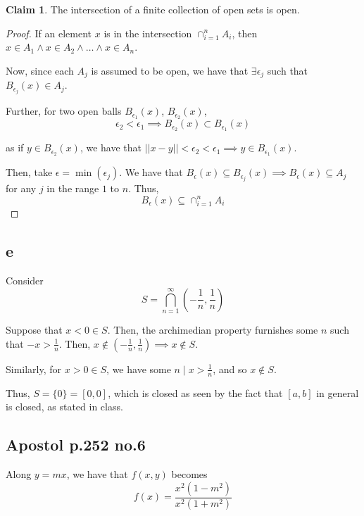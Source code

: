 \documentclass[12pt,letterpaper]{article}
\theoremstyle{definition}
\newtheorem*{claim}{Claim}
\begin{document}
\begin{claim}
  The intersection of a finite collection of open sets is open.
\end{claim}

\begin{proof}
  
  If an element $x$ is in the intersection $\cap_{i=1}^n A_i$, then $x \in A_{1} \land x \in A_{2} \land \dots \land
  x \in A_{n}$.

  Now, since each $A_{j}$ is assumed to be open, we have that $\exists
  \epsilon_j$ such that $B_{\epsilon_j}(x) \in A_{j}$. 

  
  Further, for two open balls $B_{\epsilon_1}(x)$,
  $B_{\epsilon_2}(x)$,
  \[
    \epsilon_2 < \epsilon_1 \implies B_{\epsilon_2}(x) \subset B_{\epsilon_1}(x)
  \]

  as if $y \in B_{\epsilon_2}(x)$, we have that $||x - y|| < \epsilon_2 <
  \epsilon_1 \implies y \in B_{\epsilon_1}(x)$.

  Then, take $\epsilon = \min(\epsilon_j)$. We have that $B_{\epsilon}(x)
  \subseteq B_{\epsilon_j}(x) \implies B_{\epsilon}(x) \subseteq A_{j}$ for any
  $j$ in the range $1$ to $n$. Thus,
  \[
    B_{\epsilon}(x) \subseteq \cap_{i=1}^nA_{i}
  \]
\end{proof}

\subsection*{e}

Consider
\[
  S = \bigcap_{n=1}^\infty(-\frac{1}{n}, \frac{1}{n})
\]


Suppose that $x < 0 \in S$. Then, the archimedian property furnishes some $n$
such that $-x > \frac{1}{n}$. Then, $x \notin (-\frac{1}{n}, \frac{1}{n})
\implies x \notin S$.

Similarly, for $x > 0 \in S$, we have some $n \mid x > \frac{1}{n}$, and so $x
\notin S$.

Thus, $S = \{0\} = [0, 0]$, which is closed as seen by the fact that $[a,b]$ in
general is closed, as stated in class.


\subsection*{Apostol p.252 no.6}

Along $y = mx$, we have that $f(x, y)$ becomes
\[
  f(x) = \frac{x^2(1 - m^2)}{x^2(1 + m^2)}
\]
\end{document}
